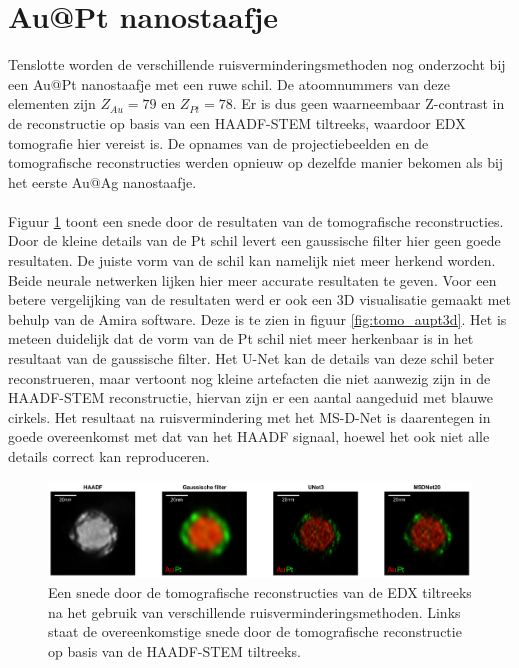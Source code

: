 \documentclass{report}
\begin{document}
\section{Au@Pt nanostaafje} \label{ch:tomo_aupt}
Tenslotte worden de verschillende ruisverminderingsmethoden nog onderzocht bij een Au@Pt nanostaafje met een ruwe schil. De atoomnummers van deze elementen zijn $Z_{Au}=79$ en $Z_{Pt}=78$. Er is dus geen waarneembaar Z-contrast in de reconstructie op basis van een HAADF-STEM tiltreeks, waardoor EDX tomografie hier vereist is. De opnames van de projectiebeelden en de tomografische reconstructies werden opnieuw op dezelfde manier bekomen als bij het eerste Au@Ag nanostaafje.
\\ \\
Figuur \ref{fig:tomo_aupt} toont een snede door de resultaten van de tomografische reconstructies. Door de kleine details van de Pt schil levert een gaussische filter hier geen goede resultaten. De juiste vorm van de schil kan namelijk niet meer herkend worden. Beide neurale netwerken lijken hier meer accurate resultaten te geven. Voor een betere vergelijking van de resultaten werd er ook een 3D visualisatie gemaakt met behulp van de Amira software. Deze is te zien in figuur \ref{fig:tomo_aupt3d}. Het is meteen duidelijk dat de vorm van de Pt schil niet meer herkenbaar is in het resultaat van de gaussische filter. Het U-Net kan de details van deze schil beter reconstrueren, maar vertoont nog kleine artefacten die niet aanwezig zijn in de HAADF-STEM reconstructie, hiervan zijn er een aantal aangeduid met blauwe cirkels. Het resultaat na ruisvermindering met het MS-D-Net is daarentegen in goede overeenkomst met dat van het HAADF signaal, hoewel het ook niet alle details correct kan reproduceren.
\begin{figure}[h!]
	\centering
	\includegraphics[width=15cm]{images/tomo/aupt.png}
	\caption{Een snede door de tomografische reconstructies van de EDX tiltreeks na het gebruik van verschillende ruisverminderingsmethoden. Links staat de overeenkomstige snede door de tomografische reconstructie op basis van de HAADF-STEM tiltreeks.}
	\label{fig:tomo_aupt}
\end{figure}
\end{document}

